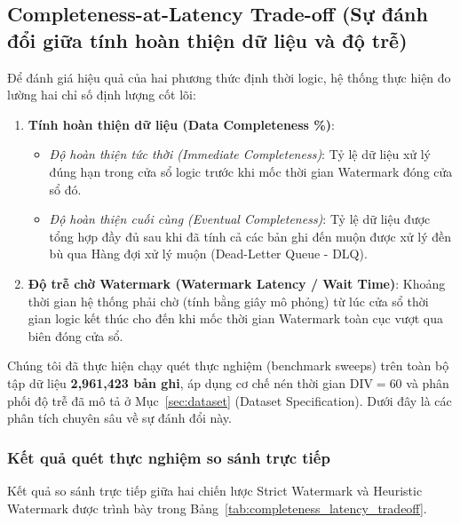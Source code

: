 \documentclass[12pt,a4paper]{article}
\begin{document}
\subsection{Completeness-at-Latency Trade-off (Sự đánh đổi giữa tính hoàn thiện dữ liệu và độ trễ)}

Để đánh giá hiệu quả của hai phương thức định thời logic, hệ thống thực hiện đo lường hai chỉ số định lượng cốt lõi:
\begin{enumerate}
    \item \textbf{Tính hoàn thiện dữ liệu (Data Completeness \%)}:
    \begin{itemize}
        \item \textit{Độ hoàn thiện tức thời (Immediate Completeness)}: Tỷ lệ dữ liệu xử lý đúng hạn trong cửa sổ logic trước khi mốc thời gian Watermark đóng cửa sổ đó.
        \item \textit{Độ hoàn thiện cuối cùng (Eventual Completeness)}: Tỷ lệ dữ liệu được tổng hợp đầy đủ sau khi đã tính cả các bản ghi đến muộn được xử lý đền bù qua Hàng đợi xử lý muộn (Dead-Letter Queue - DLQ).
    \end{itemize}
    \item \textbf{Độ trễ chờ Watermark (Watermark Latency / Wait Time)}: Khoảng thời gian hệ thống phải chờ (tính bằng giây mô phỏng) từ lúc cửa sổ thời gian logic kết thúc cho đến khi mốc thời gian Watermark toàn cục vượt qua biên đóng cửa sổ.
\end{enumerate}

Chúng tôi đã thực hiện chạy quét thực nghiệm (benchmark sweeps) trên toàn bộ tập dữ liệu \textbf{2,961,423 bản ghi}, áp dụng cơ chế nén thời gian $\text{DIV}=60$ và phân phối độ trễ đã mô tả ở Mục~\ref{sec:dataset} (Dataset Specification). Dưới đây là các phân tích chuyên sâu về sự đánh đổi này.

\subsubsection{Kết quả quét thực nghiệm so sánh trực tiếp}
Kết quả so sánh trực tiếp giữa hai chiến lược Strict Watermark và Heuristic Watermark được trình bày trong Bảng~\ref{tab:completeness_latency_tradeoff}.
\end{document}
